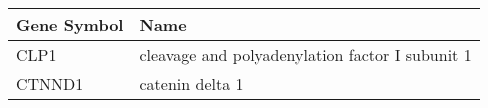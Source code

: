 \begin{tabular}{ll}
\toprule
Gene Symbol &                                            Name \\
\midrule
       CLP1 & cleavage and polyadenylation factor I subunit 1 \\
     CTNND1 &                                 catenin delta 1 \\
\bottomrule
\end{tabular}
